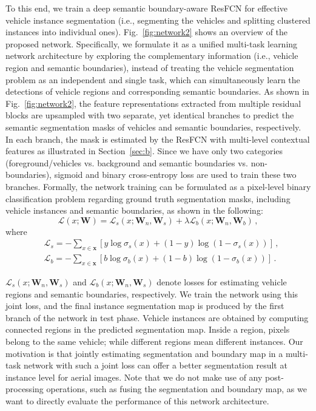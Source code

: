 \documentclass[journal]{IEEEtran}
\begin{document}
To this end, we train a deep semantic boundary-aware ResFCN for effective vehicle instance segmentation (i.e., segmenting the vehicles and splitting clustered instances into individual ones). Fig.~\ref{fig:network2} shows an overview of the proposed network. Specifically, we formulate it as a unified multi-task learning network architecture by exploring the complementary information (i.e., vehicle region and semantic boundaries), instead of treating the vehicle segmentation problem as an independent and single task, which can simultaneously learn the detections of vehicle regions and corresponding semantic boundaries. As shown in Fig.~\ref{fig:network2}, the feature representations extracted from multiple residual blocks are upsampled with two separate, yet identical branches to predict the semantic segmentation masks of vehicles and semantic boundaries, respectively. In each branch, the mask is estimated by the ResFCN with multi-level contextual features as illustrated in Section~\ref{sec:b}. Since we have only two categories (foreground/vehicles vs. background and semantic boundaries vs. non-boundaries), sigmoid and binary cross-entropy loss are used to train these two branches. Formally, the network training can be formulated as a pixel-level binary classification problem regarding ground truth segmentation masks, including vehicle instances and semantic boundaries, as shown in the following:
\begin{equation}\label{eq:mtl1}
\mathcal{L}(x;\bm{W})=\mathcal{L}_s(x;\bm{W}_n,\bm{W}_s)+\lambda \mathcal{L}_b(x;\bm{W}_n,\bm{W}_b)\,,
\end{equation}
where
\begin{equation}\label{eq:mtl1}
\begin{split}
&\mathcal{L}_s=-\sum_{x\in \bm{x}}[y\log \sigma_s(x)+(1-y)\log (1-\sigma_s(x))]\,,\\
&\mathcal{L}_b=-\sum_{x\in \bm{x}}[b\log \sigma_b(x)+(1-b)\log (1-\sigma_b(x))]\,.
\end{split}
\end{equation}
\par
$\mathcal{L}_s(x;\bm{W}_n,\bm{W}_s)$ and $\mathcal{L}_b(x;\bm{W}_n,\bm{W}_s)$ denote losses for estimating vehicle regions and semantic boundaries, respectively. We train the network using this joint loss, and the final instance segmentation map is produced by the first branch of the network in test phase. Vehicle instances are obtained by computing connected regions in the predicted segmentation map. Inside a region, pixels belong to the same vehicle; while different regions mean different instances. Our motivation is that jointly estimating segmentation and boundary map in a multi-task network with such a joint loss can offer a better segmentation result at instance level for aerial images. Note that we do not make use of any post-processing operations, such as fusing the segmentation and boundary map, as we want to directly evaluate the performance of this network architecture.
\end{document}
